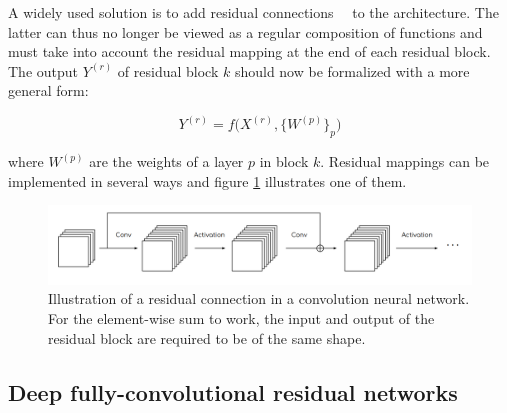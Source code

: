         A widely used solution is to add
        residual connections~\cite{DBLP:journals/corr/HeZRS15}~\cite{residual network}
        to the architecture. The latter can thus no longer be viewed as
        a regular composition of functions and must take into account
        the residual mapping at the end of each residual block.
        The output $Y^{(r)}$ of residual block $k$ should now
        be formalized with a more general form:

        \begin{equation}
            Y^{(r)} = f\big(X^{(r)}, \{W^{(p)}\}_p\big)
        \end{equation}

        where $W^{(p)}$ are the weights of a layer $p$ in block $k$.
        Residual mappings can be implemented in several ways and figure \ref{resnet}
        illustrates one of them.

        \begin{figure}[H]
            \begin{center}
                \includegraphics[width=\textwidth, keepaspectratio]{imgs/resnet.png}
                \caption{Illustration of a residual connection in a convolution
                neural network. For the element-wise sum to work, the input and output
                of the residual block are required to be of the same shape.}
                \label{resnet}
            \end{center}
        \end{figure}

    \subsection{Deep fully-convolutional residual networks}

